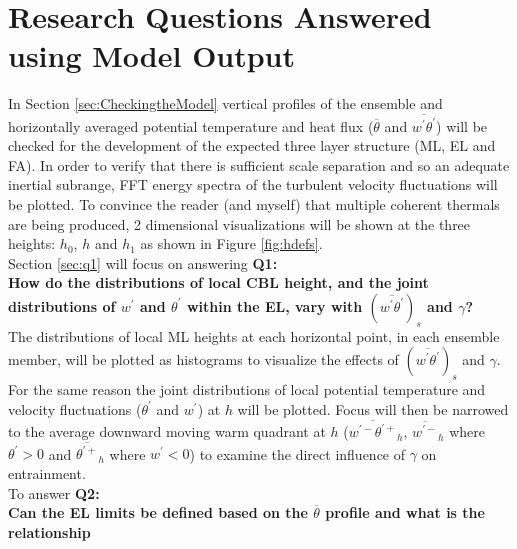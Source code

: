 
\chapter{Research Questions Answered using Model Output}
\label{ch:results}
\setlength{\parindent}{0cm}

In Section \ref{sec:CheckingtheModel} vertical profiles of the ensemble and horizontally averaged potential
temperature and heat flux ($\overline{\theta}$ and $\overline{w^{'}\theta^{'}}$) will be checked for the development
 of the expected three layer structure (\acs{ML}, \acs{EL} and \acs{FA}).  In order to verify that there is sufficient
scale separation and so an adequate inertial subrange, \acs{FFT} energy spectra of the turbulent velocity fluctuations 
will be plotted. To convince the reader (and myself) that multiple coherent thermals are being produced, 2 dimensional visualizations
will be shown at the three heights: $h_{0}$, $h$ and $h_{1}$ as shown in Figure \ref{fig:hdefs}.\\

Section \ref{sec:q1} will focus on answering \textbf{Q1:} \\ 

\textbf{How do the distributions of local \acs{CBL} height, and the joint distributions of $w^{'}$ and $\theta^{'}$ within the \acs{EL}, vary with $(\overline{w^{'}\theta^{'}})_{s}$ and $\gamma$?}\\

The distributions of local \acs{ML} heights at each horizontal point, in each ensemble member, will be plotted as histograms to visualize the effects of $(\overline{w^{'}\theta^{'}})_{s}$ and $\gamma$.  For the same reason the joint distributions of local potential temperature and velocity fluctuations ($\theta^{'}$ and $w^{'}$) at $h$ will be plotted.  Focus will then be narrowed to the average downward moving warm quadrant at $h$ ($\overline{w^{'-}\theta^{'+}}_{h}$, $\overline{w^{'-}}_{h}$  where $ \theta^{'} >0$ and $\overline{\theta^{'+}}_{h} $ where $ w^{'} < 0 $) to examine the direct influence of $\gamma$ on entrainment.\\       

To answer \textbf{Q2:}\\ 

\textbf{Can the \acs{EL} limits be defined based on the $\overline{\theta}$ profile and what is the relationship} 

